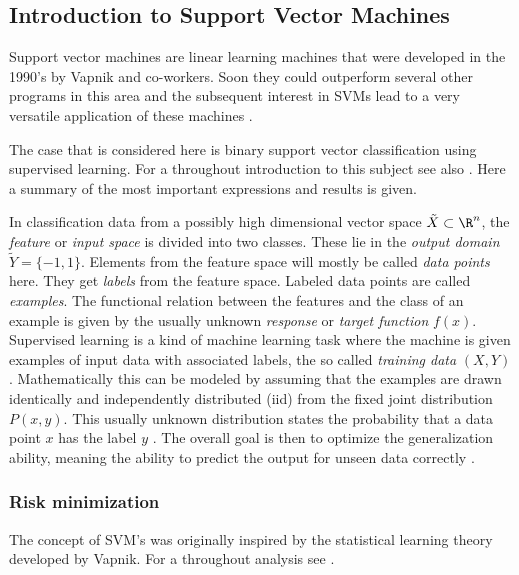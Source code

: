
\subsection{Introduction to Support Vector Machines}
Support vector machines are linear learning machines that were developed in the 1990's by Vapnik and co-workers. Soon they could outperform several other programs in this area \cite{Cristianini2000} and the subsequent interest in SVMs lead to a very versatile application of these machines \cite{Kunapuli2008}.

The case that is considered here is binary support vector classification using supervised learning. 
For a throughout introduction to this subject see also \cite{Cristianini2000}. Here a summary of the most important expressions and results is given.

In classification data from a possibly high dimensional vector space \(\tilde{X} \subset \R^n\), the \emph{feature} or \emph{input space} is divided into two classes. These lie in the \emph{output domain} \(\tilde{Y} = \{-1,1\}\). Elements from the feature space will mostly be called \emph{data points} here. They get \emph{labels} from the feature space. Labeled data points are called \emph{examples}.
The functional relation between the features and the class of an example is given by the usually unknown \emph{response} or \emph{target function} \(f(x)\).
Supervised learning is a kind of machine learning task where the machine is given examples of input data with associated labels, the so called \emph{training data} \((X,Y)\). Mathematically this can be modeled by assuming that the examples are  drawn identically and independently distributed (iid) from the fixed joint distribution \(P(x,y)\). This usually unknown distribution states the probability that a data point \(x\) has the label \(y\) \cite[p. 988]{Vapnik1999}.
The overall goal is then to optimize the generalization ability, meaning the ability to predict the output for unseen data correctly \cite[chapter 1.2]{Cristianini2000}.

\subsubsection{Risk minimization}
The concept of SVM's was originally inspired by the statistical learning theory developed by Vapnik. For a throughout analysis see \cite{Vapnik1998}.

